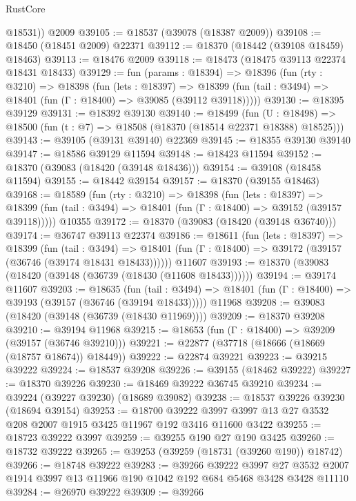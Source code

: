 \begin{lexlean}{RustCore}
\begin{coremodule}
        @18531))
    @2009
@39105 := @18537 (@39078 (@18387 @2009))
@39108 := @18450 (@18451 @2009) @22371
@39112 := @18370 (@18442 (@39108 @18459) @18463)
@39113 := @18476 @2009
@39118 := @18473 (@18475 @39113 @22374 @18431 @18433)
@39129 := fun (params : @18394) =>
  @18396
    (fun (rty : @3210) =>
    @18398
      (fun (lets : @18397) =>
      @18399 (fun (tail : @3494) => @18401 (fun (Γ : @18400) => @39085 (@39112 @39118)))))
@39130 := @18395 @39129
@39131 := @18392 @39130
@39140 := @18499
    (fun (U : @18498) => @18500 (fun (t : @7) => @18508 (@18370 (@18514 @22371 @18388) @18525)))
@39143 := @39105 (@39131 @39140) @22369
@39145 := @18355 @39130 @39140
@39147 := @18586 @39129 @11594
@39148 := @18423 @11594
@39152 := @18370 (@39083 (@18420 (@39148 @18436)))
@39154 := @39108 (@18458 @11594)
@39155 := @18442 @39154
@39157 := @18370 (@39155 @18463)
@39168 := @18589
    (fun (rty : @3210) =>
    @18398
      (fun (lets : @18397) =>
      @18399 (fun (tail : @3494) => @18401 (fun (Γ : @18400) => @39152 (@39157 @39118)))))
    @10355
@39172 := @18370 (@39083 (@18420 (@39148 @36740)))
@39174 := @36747 @39113 @22374
@39186 := @18611
    (fun (lets : @18397) =>
    @18399
      (fun (tail : @3494) =>
      @18401 (fun (Γ : @18400) => @39172 (@39157 (@36746 (@39174 @18431 @18433))))))
    @11607
@39193 := @18370 (@39083 (@18420 (@39148 (@36739 (@18430 (@11608 @18433))))))
@39194 := @39174 @11607
@39203 := @18635
    (fun (tail : @3494) => @18401 (fun (Γ : @18400) => @39193 (@39157 (@36746 (@39194 @18433)))))
    @11968
@39208 := @39083 (@18420 (@39148 (@36739 (@18430 @11969))))
@39209 := @18370 @39208
@39210 := @39194 @11968
@39215 := @18653 (fun (Γ : @18400) => @39209 (@39157 (@36746 @39210)))
@39221 := @22877 (@37718 (@18666 (@18669 (@18757 @18674)) @18449))
@39222 := @22874 @39221
@39223 := @39215 @39222
@39224 := @18537 @39208
@39226 := @39155 (@18462 @39222)
@39227 := @18370 @39226
@39230 := @18469 @39222 @36745 @39210
@39234 := @39224 (@39227 @39230) (@18689 @39082)
@39238 := @18537 @39226 @39230 (@18694 @39154)
@39253 := @18700
    @39222
    @3997
    @3997
    @13
    @27
    @3532
    @208
    @2007
    @1915
    @3425
    @11967
    @192
    @3416
    @11600
    @3422
@39255 := @18723 @39222 @3997
@39259 := @39255 @190 @27 @190 @3425
@39260 := @18732 @39222
@39265 := @39253 (@39259 (@18731 (@39260 @190)) @18742)
@39266 := @18748 @39222
@39283 := @39266
    @39222
    @3997
    @27
    @3532
    @2007
    @1914
    @3997
    @13
    @11966
    @190
    @1042
    @192
    @684
    @5468
    @3428
    @3428
    @11110
@39284 := @26970 @39222
@39309 := @39266

\end{coremodule}
\end{lexlean}
